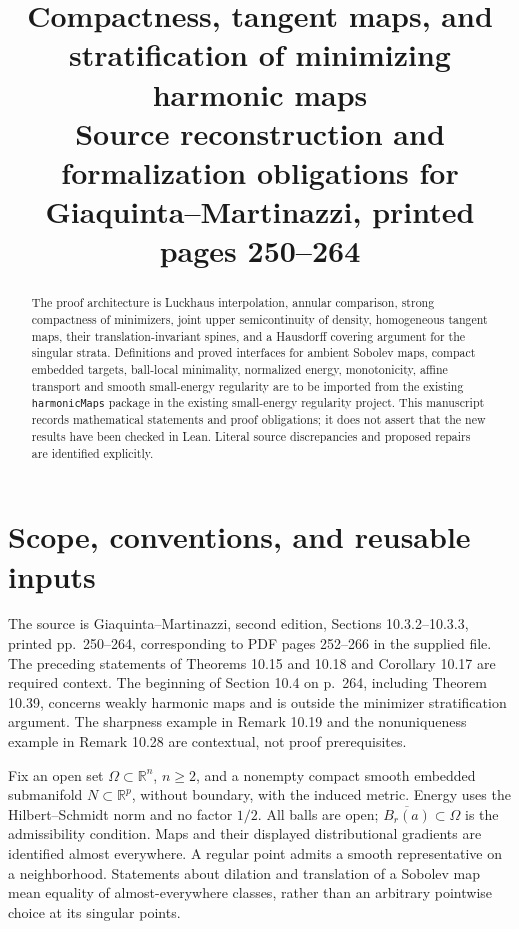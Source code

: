 \documentclass[11pt,a4paper]{article}
\title{Compactness, tangent maps, and stratification of minimizing harmonic maps\\
\large Source reconstruction and formalization obligations for
Giaquinta--Martinazzi, printed pages 250--264}
\author{}
\date{}
\numberwithin{equation}{section}
\theoremstyle{definition}
\theoremstyle{remark}
\newcommand{\R}{\mathbb R}
\begin{document}
\maketitle

\begin{abstract}
The proof architecture is Luckhaus interpolation, annular comparison,
strong compactness of minimizers, joint upper semicontinuity of density,
homogeneous tangent maps, their translation-invariant spines, and a
Hausdorff covering argument for the singular strata. Definitions and proved
interfaces for ambient Sobolev maps, compact embedded targets, ball-local
minimality, normalized energy, monotonicity, affine transport and smooth
small-energy regularity are to be imported from the existing
\texttt{harmonicMaps} package in the existing small-energy regularity project.
This manuscript records mathematical statements and proof obligations; it
does not assert that the new results have been checked in Lean. Literal
source discrepancies and proposed repairs are identified explicitly.
\end{abstract}
\tableofcontents

\section{Scope, conventions, and reusable inputs}\label{sec:scope}
The source is Giaquinta--Martinazzi, second edition, Sections 10.3.2--10.3.3,
printed pp.~250--264, corresponding to PDF pages 252--266 in the supplied
file. The preceding statements of Theorems 10.15 and 10.18 and Corollary
10.17 are required context. The beginning of Section 10.4 on p.~264,
including Theorem 10.39, concerns weakly harmonic maps and is outside the
minimizer stratification argument. The sharpness example in Remark 10.19
and the nonuniqueness example in Remark 10.28 are contextual, not proof
prerequisites.

Fix an open set $\Omega\subset\R^n$, $n\ge2$, and a nonempty compact smooth
embedded submanifold $N\subset\R^p$, without boundary, with the induced
metric. Energy uses the Hilbert--Schmidt norm and no factor $1/2$.
All balls are open; $\overline{B_r(a)}\subset\Omega$ is the admissibility
condition. Maps and their displayed distributional gradients are identified
almost everywhere. A regular point admits a smooth representative on a
neighborhood. Statements about dilation and translation of a Sobolev map
mean equality of almost-everywhere classes, rather than an arbitrary
pointwise choice at its singular points.
\end{document}

